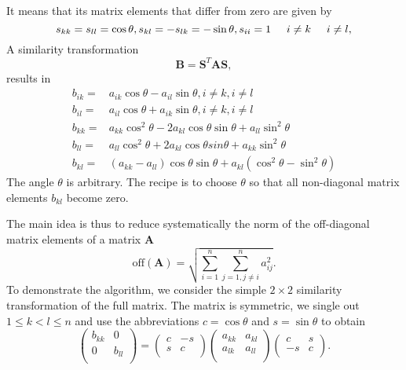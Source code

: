 \documentclass[%
oneside,                 %
final,                   %
10pt]{article}
\begin{document}
It means that its matrix elements that differ
from zero are given by
\[
    s_{kk}= s_{ll}=\cos\theta, 
    s_{kl}=-s_{lk}= -\sin\theta, 
    s_{ii}=1\hspace{0.5cm} i\ne k \hspace{0.5cm} i \ne l,
\]
A similarity transformation 
\[
     \mathbf{B}= \mathbf{S}^T \mathbf{A}\mathbf{S},
\]
results in 
\begin{align*}
b_{ik} =& a_{ik}\cos\theta - a_{il}\sin\theta , i \ne k, i \ne l \\
b_{il} =& a_{il}\cos\theta + a_{ik}\sin\theta , i \ne k, i \ne l \nonumber\\
b_{kk} =& a_{kk}\cos^2\theta - 2a_{kl}\cos\theta \sin\theta +a_{ll}\sin^2\theta\nonumber\\
b_{ll} =& a_{ll}\cos^2\theta +2a_{kl}\cos\theta sin\theta +a_{kk}\sin^2\theta\nonumber\\
b_{kl} =& (a_{kk}-a_{ll})\cos\theta \sin\theta +a_{kl}(\cos^2\theta-\sin^2\theta)\nonumber 
\end{align*}
The angle $\theta$ is  arbitrary. The recipe is to choose  $\theta$ so that all
non-diagonal matrix elements $b_{kl}$ become zero.  

The main idea is thus to reduce systematically the 
norm of the 
off-diagonal matrix elements  of a matrix  $\mathbf{A}$ 
\[
\mathrm{off}(\mathbf{A}) = \sqrt{\sum_{i=1}^n\sum_{j=1,j\ne i}^n a_{ij}^2}.
\]
 To demonstrate the algorithm, we consider the  simple $2\times 2$  similarity transformation
of the full matrix. The matrix is symmetric, we single out $ 1 \le k < l \le n$  and 
use the abbreviations $c=\cos\theta$ and $s=\sin\theta$ to obtain
\[
 \left( \begin{array}{cc} b_{kk} & 0 \\
                          0 & b_{ll} \\\end{array} \right)  =  \left( \begin{array}{cc} c & -s \\
                          s &c \\\end{array} \right)  \left( \begin{array}{cc} a_{kk} & a_{kl} \\
                          a_{lk} &a_{ll} \\\end{array} \right) \left( \begin{array}{cc} c & s \\
                          -s & c \\\end{array} \right).
\]
\end{document}

